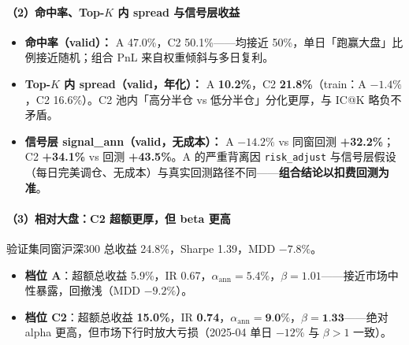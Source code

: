 \documentclass[UTF8,a4paper,12pt]{ctexart}
\begin{document}
\paragraph{（2）命中率、Top-$K$ 内 spread 与信号层收益}

\begin{itemize}[leftmargin=2em]
  \item \textbf{命中率（valid）：} A 47.0\%，C2 50.1\%——均接近 50\%，单日「跑赢大盘」比例接近随机；组合 PnL 来自权重倾斜与多日复利。
  \item \textbf{Top-$K$ 内 spread（valid，年化）：} A \textbf{10.2\%}，C2 \textbf{21.8\%}（train：A $-1.4\%$，C2 16.6\%）。C2 池内「高分半仓 vs 低分半仓」分化更厚，与 IC@K 略负不矛盾。
  \item \textbf{信号层 signal\_ann（valid，无成本）：} A \textbf{$-14.2\%$} vs 同窗回测 \textbf{+32.2\%}；C2 \textbf{+34.1\%} vs 回测 \textbf{+43.5\%}。A 的严重背离因 \texttt{risk\_adjust} 与信号层假设（每日完美调仓、无成本）与真实回测路径不同——\textbf{组合结论以扣费回测为准}。
\end{itemize}

\paragraph{（3）相对大盘：C2 超额更厚，但 beta 更高}

验证集同窗沪深300 总收益 24.8\%，Sharpe 1.39，MDD $-7.8\%$。
\begin{itemize}[leftmargin=2em]
  \item \textbf{档位 A}：超额总收益 5.9\%，IR 0.67，$\alpha_{\mathrm{ann}}=5.4\%$，$\beta=1.01$——接近市场中性暴露，回撤浅（MDD $-9.2\%$）。
  \item \textbf{档位 C2}：超额总收益 \textbf{15.0\%}，IR \textbf{0.74}，$\alpha_{\mathrm{ann}}=\textbf{9.0\%}$，$\beta=\textbf{1.33}$——绝对 alpha 更高，但市场下行时放大亏损（2025-04 单日 $-12\%$ 与 $\beta>1$ 一致）。
\end{itemize}
\end{document}
